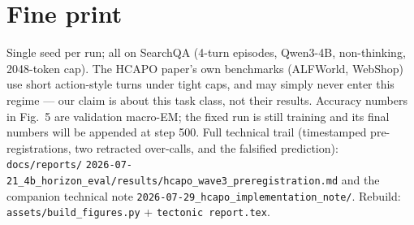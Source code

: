 \documentclass[11pt]{article}
\begin{document}
\section*{Fine print}
Single seed per run; all on SearchQA (4-turn episodes, Qwen3-4B, non-thinking, 2048-token cap).
The HCAPO paper's own benchmarks (ALFWorld, WebShop) use short action-style turns under tight
caps, and may simply never enter this regime --- our claim is about this task class, not their
results. Accuracy numbers in Fig.~5 are validation macro-EM; the fixed run is still training and
its final numbers will be appended at step 500. Full technical trail (timestamped pre-registrations,
two retracted over-calls, and the falsified prediction): \texttt{docs/reports/}
\texttt{2026-07-21\_4b\_horizon\_eval/results/hcapo\_wave3\_preregistration.md} and the companion
technical note \texttt{2026-07-29\_hcapo\_implementation\_note/}. Rebuild:
\texttt{assets/build\_figures.py} + \texttt{tectonic report.tex}.
\end{document}

